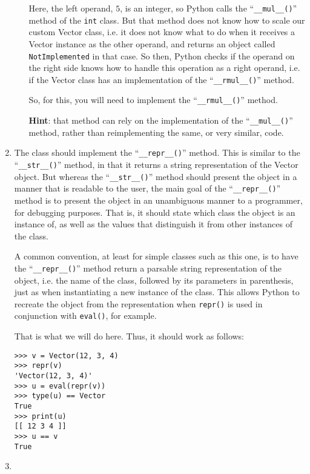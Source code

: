 \begin{enumerate}
\begin{enumerate}
Here, the left operand, $5$, is an integer,
so Python calls the ``\texttt{\_\_mul\_\_()}'' method of the \texttt{int} class.
But that method does not know how to scale our custom Vector class,
i.e. it does not know what to do when it receives a Vector instance as the other operand,
and returns an object called \texttt{NotImplemented} in that case.
So then, Python checks if the operand on the right side knows
how to handle this operation as a right operand,
i.e. if the Vector class has an implementation of the ``\texttt{\_\_rmul\_\_()}'' method.

So, for this, you will need to implement the ``\texttt{\_\_rmul\_\_()}'' method.

\textbf{Hint}: that method can rely on the implementation of the ``\texttt{\_\_mul\_\_()}'' method,
rather than reimplementing the same, or very similar, code.

\end{enumerate}

\item
The class should implement the ``\texttt{\_\_repr\_\_()}'' method.
This is similar to the ``\texttt{\_\_str\_\_()}'' method,
in that it returns a string representation of the Vector object.
But whereas the ``\texttt{\_\_str\_\_()}'' method
should present the object in a manner that is readable to the user,
the main goal of the ``\texttt{\_\_repr\_\_()}'' method
is to present the object in an unambiguous manner to a programmer,
for debugging purposes.
That is, it should state which class the object is an instance of,
as well as the values that distinguish it from other instances of the class.

A common convention, at least for simple classes such as this one,
is to have the ``\texttt{\_\_repr\_\_()}'' method
return a parsable string representation of the object,
i.e. the name of the class, followed by its parameters in parenthesis,
just as when instantiating a new instance of the class.
This allows Python to recreate the object from the representation
when \texttt{repr()} is used in conjunction with \texttt{eval()}, for example.

That is what we will do here.
Thus, it should work as follows:
\begin{verbatim}
>>> v = Vector(12, 3, 4)
>>> repr(v)
'Vector(12, 3, 4)'
>>> u = eval(repr(v))
>>> type(u) == Vector
True
>>> print(u)
[[ 12 3 4 ]]
>>> u == v
True
\end{verbatim}

\item
\begin{enumerate}


\end{enumerate}
\end{enumerate}
